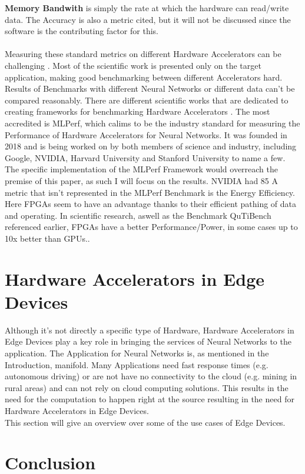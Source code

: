 \documentclass[conference]{IEEEtran}
\begin{document}
\textbf{Memory Bandwith} is simply the rate at which the hardware can read/write data.
The Accuracy is also a metric cited, but it will not be discussed since the software is the contributing factor for this.
\\
\\
Measuring these standard metrics on different Hardware Accelerators can be challenging \cite{capra2020updated}. Most of the scientific work is presented only on the target application, making good benchmarking between different Accelerators hard. Results of Benchmarks with different Neural Networks or different data can't be compared reasonably.
There are different scientific works that are dedicated to creating frameworks for benchmarking Hardware Accelerators \cite{chen2012benchnn} \cite{zhu2018benchmarking} \cite{blott2019qutibench} \cite{dong2017dnnmark}. The most accredited is MLPerf, which calims to be the industry standard for measuring the Performance of Hardware Accelerators for Neural Networks\cite{mattson2020mlperf}. It was founded in 2018 and is being worked on by both members of science and industry, including Google, NVIDIA, Harvard University and Stanford University to name a few. The specific implementation of the MLPerf Framework would overreach the premise of this paper, as such I will focus on the results. 
NVIDIA had 85%
A metric that isn't represented in the MLPerf Benchmark is the Energy Efficiency. Here FPGAs seem to have an advantage thanks to their efficient pathing of data and operating. In scientific research, aswell as the Benchmark QuTiBench referenced earlier, FPGAs have a better Performance/Power, in some cases up to 10x better than GPUs..


\section{Hardware Accelerators in Edge Devices}
Although it's not directly a specific type of Hardware, Hardware Accelerators in Edge Devices play a key role in bringing the services of Neural Networks to the application. The Application for Neural Networks is, as mentioned in the Introduction, manifold. Many Applications need fast response times (e.g. autonomous driving) or are not have no connectivity to the cloud (e.g. mining in rural areas) and can not rely on cloud computing solutions. This results in the need for the computation to happen right at the source resulting in the need for Hardware Accelerators in Edge Devices.
\\
This section will give an overview over some of the use cases of Edge Devices.






\section{Conclusion}

\newpage
\quad
\newpage


\end{document}
